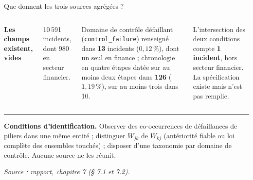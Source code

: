 \documentclass[aspectratio=169,10pt,t]{beamer}
\newcommand{\source}[1]{\par\vfill{\tiny\color{gris}\textit{Source : #1}}\par\vspace{-1mm}}
\begin{document}
\begin{frame}{Que donnent les trois sources agrégées ?}
\begin{columns}[T,onlytextwidth]
    {\color{accent}\textbf{Les champs existent, vides}}\par\vspace{1mm}
    10\,591 incidents, dont 980 en secteur financier.\par\vspace{.8mm}
    Domaine de contrôle défaillant (\texttt{control\_failure}) renseigné dans \textbf{13} incidents ($0{,}12\,\%$), dont un seul en finance ; chronologie en quatre étapes datée sur au moins deux étapes dans \textbf{126} ($1{,}19\,\%$), sur au moins trois dans 10.\par\vspace{.8mm}
    L'intersection des deux conditions compte \textbf{1 incident}, hors secteur financier. La spécification existe mais n'est pas remplie.
  \end{columns}
  \vspace{2mm}
  {\color{filet}\rule{\linewidth}{.35pt}}\par\vspace{1.5mm}
  \footnotesize\textbf{Conditions d'identification.} Observer des co-occurrences de défaillances de piliers dans une même entité ; distinguer $W_{jk}$ de $W_{kj}$ (antériorité fiable ou loi complète des ensembles touchés) ; disposer d'une taxonomie par domaine de contrôle. Aucune source ne les réunit.
  \source{rapport, chapitre 7 (§ 7.1 et 7.2).}
\end{frame}
\end{document}

